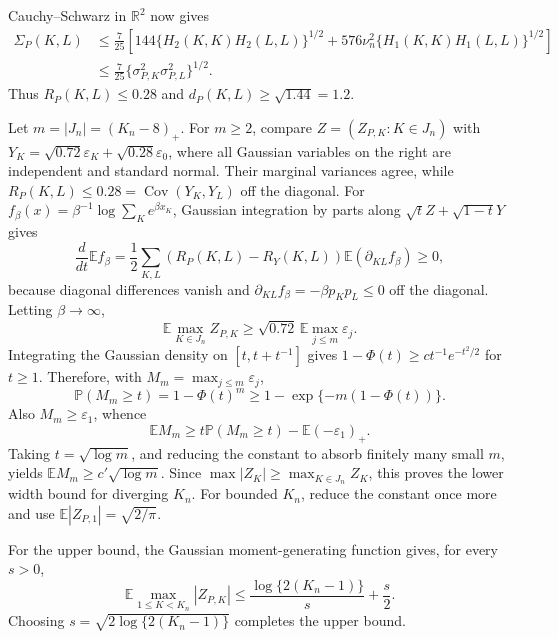 Cauchy--Schwarz in \(\mathbb R^2\) now gives
\[
 \begin{aligned}
 \Sigma_P(K,L)
 &\leq\frac7{25}\left[144\{H_2(K,K)H_2(L,L)\}^{1/2}
 +576\nu_n^2\{H_1(K,K)H_1(L,L)\}^{1/2}\right]\\
 &\leq\frac7{25}\{\sigma_{P,K}^2\sigma_{P,L}^2\}^{1/2}.
 \end{aligned}
\]
Thus \(R_P(K,L)\leq0.28\) and \(d_P(K,L)\geq\sqrt{1.44}=1.2\).

Let \(m=|J_n|=(K_n-8)_+\).  For \(m\geq2\), compare \(Z=(Z_{P,K}:K\in J_n)\) with \(Y_K=\sqrt{0.72}\varepsilon_K+\sqrt{0.28}\varepsilon_0\), where all Gaussian variables on the right are independent and standard normal.  Their marginal variances agree, while \(R_P(K,L)\leq0.28=\operatorname{Cov}(Y_K,Y_L)\) off the diagonal.  For \(f_\beta(x)=\beta^{-1}\log\sum_Ke^{\beta x_K}\), Gaussian integration by parts along \(\sqrt tZ+\sqrt{1-t}Y\) gives
\[
 \frac d{dt}\mathbb Ef_\beta
 =\frac12\sum_{K,L}(R_P(K,L)-R_Y(K,L))
 \mathbb E(\partial_{KL}f_\beta)\geq0,
\]
because diagonal differences vanish and \(\partial_{KL}f_\beta=-\beta p_Kp_L\leq0\) off the diagonal.  Letting \(\beta\to\infty\),
\[
 \mathbb E\max_{K\in J_n}Z_{P,K}
 \geq\sqrt{0.72}\,\mathbb E\max_{j\leq m}\varepsilon_j.
\]
Integrating the Gaussian density on \([t,t+t^{-1}]\) gives \(1-\Phi(t)\geq ct^{-1}e^{-t^2/2}\) for \(t\geq1\).  Therefore, with \(M_m=\max_{j\leq m}\varepsilon_j\),
\[
 \mathbb P(M_m\geq t)=1-\Phi(t)^m
 \geq1-\exp\{-m(1-\Phi(t))\}.
\]
Also \(M_m\geq\varepsilon_1\), whence
\[
 \mathbb EM_m\geq t\mathbb P(M_m\geq t)-\mathbb E(-\varepsilon_1)_+.
\]
Taking \(t=\sqrt{\log m}\), and reducing the constant to absorb finitely many small \(m\), yields \(\mathbb EM_m\geq c'\sqrt{\log m}\).  Since \(\max|Z_K|\geq\max_{K\in J_n}Z_K\), this proves the lower width bound for diverging \(K_n\).  For bounded \(K_n\), reduce the constant once more and use \(\mathbb E|Z_{P,1}|=\sqrt{2/\pi}\).

For the upper bound, the Gaussian moment-generating function gives, for every \(s>0\),
\[
 \mathbb E\max_{1\leq K<K_n}|Z_{P,K}|
 \leq\frac{\log\{2(K_n-1)\}}s+\frac s2.
\]
Choosing \(s=\sqrt{2\log\{2(K_n-1)\}}\) completes the upper bound.